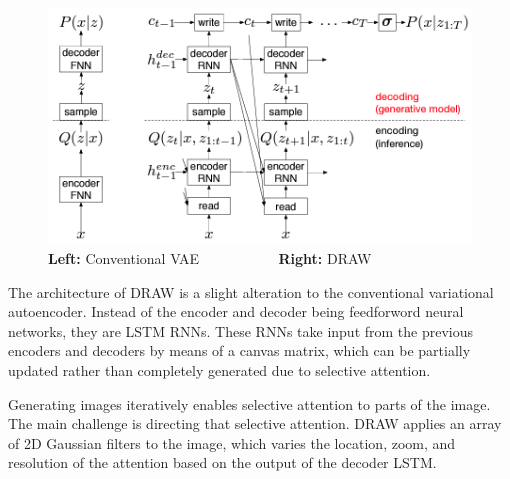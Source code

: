 \documentclass{article}
\begin{document}
\begin{figure}[ht]
\begin{center}
\includegraphics[]{VAE--DRAW.png}
\caption{\textbf{Left:} Conventional VAE ~~~~~~~~~~ \textbf{Right:} DRAW}
\end{center}
\end{figure}

The architecture of DRAW is a slight alteration to the conventional variational autoencoder. Instead of the encoder and decoder being feedforword neural networks, they are LSTM RNNs. These RNNs take input from the previous encoders and decoders by means of a canvas matrix, which can be partially updated rather than completely generated due to selective attention.

Generating images iteratively enables selective attention to parts of the image. The main challenge is directing that selective attention. DRAW applies an array of 2D Gaussian filters to the image, which varies the location, zoom, and resolution of the attention based on the output of the decoder LSTM.
\end{document}
